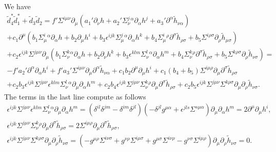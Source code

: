 \documentclass[10pt]{report}
\theoremstyle{definition}
\begin{document}
We have
\begin{align}\nonumber
\tilde{d}_4^* \tilde{d}_1^* +\tilde{d}_3 \tilde{d}_2 =f' \Sigma^{i\mu\nu} \partial_\mu(a_1'  \partial_\nu h + a_2' \Sigma^j_\nu{}^\alpha \partial_\alpha h^j +a_3' \partial^\alpha \tilde{h}_{\nu\alpha}) \\ \nonumber
+ c_1 \partial^\mu ( b_1 \Sigma^i_\mu{}^\alpha \partial_\alpha h + b_2 \partial_\mu h^i + b_3 \epsilon^{ijk} \Sigma^j_\mu{}^\alpha \partial_\alpha h^k + b_4 \Sigma^i_\mu{}^\rho \partial^\sigma \tilde{h}_{\rho\sigma} + b_5 \Sigma^{i\rho\sigma}  \partial_\rho \tilde{h}_{\mu\sigma} ) \\ \nonumber
+  c_2 \epsilon^{ijk} \Sigma^{j\mu\nu} \partial_\mu ( b_1 \Sigma^k_\nu{}^\alpha \partial_\alpha h + b_2 \partial_\nu h^k + b_3 \epsilon^{klm} \Sigma^l_\nu{}^\alpha \partial_\alpha h^m + b_4 \Sigma^k_\nu{}^\rho \partial^\sigma \tilde{h}_{\rho\sigma} + b_5 \Sigma^{k\rho\sigma}  \partial_\rho \tilde{h}_{\nu\sigma} ) =  \\ \nonumber
- f' a_2' \partial^\alpha \partial_\alpha h^i
+ f' a_3'\Sigma^{i\mu\nu} \partial_\mu \partial^\alpha \tilde{h}_{\nu\alpha}  + c_1 b_2 \partial^\mu \partial_\mu h^i + c_1 (b_4 +b_5) \Sigma^{i\mu\rho} \partial_\mu \partial^\sigma \tilde{h}_{\rho\sigma} 
\\ \nonumber
+ c_2 b_3 \epsilon^{ijk} \Sigma^{j\mu\nu}  \epsilon^{klm} \Sigma^l_\nu{}^\alpha \partial_\mu \partial_\alpha h^m + c_2 b_4 \epsilon^{ijk} \Sigma^{j\mu\nu}
\Sigma^k_\nu{}^\rho \partial_\mu \partial^\sigma \tilde{h}_{\rho\sigma} + c_2 b_5 \epsilon^{ijk} \Sigma^{j\mu\nu} \Sigma^{k\rho\sigma}  \partial_\mu \partial_\rho \tilde{h}_{\nu\sigma}.
\end{align}
The terms in the last line compute as follows
\begin{align}
\epsilon^{ijk} \Sigma^{j\mu\nu}  \epsilon^{klm} \Sigma^l_\nu{}^\alpha \partial_\mu \partial_\alpha h^m= (\delta^{il} \delta^{jm} - \delta^{im}\delta^{jl}) ( - \delta^{jl} g^{\mu\alpha} + \epsilon^{jls}\Sigma^{s\mu\alpha})  \partial_\mu \partial_\alpha h^m= 2 \partial^\mu \partial_\mu h^i, \\ \nonumber
\epsilon^{ijk} \Sigma^{j\mu\nu}\Sigma^k_\nu{}^\rho \partial_\mu \partial^\sigma \tilde{h}_{\rho\sigma}= 2 \Sigma^{i\mu\rho} \partial_\mu \partial^\sigma \tilde{h}_{\rho\sigma}, \\ \nonumber
\epsilon^{ijk} \Sigma^{j\mu\nu} \Sigma^{k\rho\sigma}  \partial_\mu \partial_\rho \tilde{h}_{\nu\sigma} = (- g^{\mu\rho} \Sigma^{i\nu\sigma} + g^{\nu\rho} \Sigma^{i\mu\sigma} + g^{\mu\sigma} \Sigma^{i\nu\rho} - g^{\nu\sigma} \Sigma^{i\mu\rho})\partial_\mu \partial_\rho \tilde{h}_{\nu\sigma}= 0.
\end{align}
\end{document}
